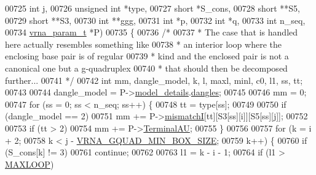 \begin{DoxyCode}
00725                                       \textcolor{keywordtype}{int}           j,
00726                                       \textcolor{keywordtype}{unsigned} \textcolor{keywordtype}{int}  *type,
00727                                       \textcolor{keywordtype}{short}         *S\_cons,
00728                                       \textcolor{keywordtype}{short}         **S5,
00729                                       \textcolor{keywordtype}{short}         **S3,
00730                                       \textcolor{keywordtype}{int}           **ggg,
00731                                       \textcolor{keywordtype}{int}           *p,
00732                                       \textcolor{keywordtype}{int}           *q,
00733                                       \textcolor{keywordtype}{int}           n\_seq,
00734                                       \mbox{\hyperlink{group__energy__parameters_structvrna__param__s}{vrna\_param\_t}}  *P)
00735 \{
00736   \textcolor{comment}{/*}
00737 \textcolor{comment}{   * The case that is handled here actually resembles something like}
00738 \textcolor{comment}{   * an interior loop where the enclosing base pair is of regular}
00739 \textcolor{comment}{   * kind and the enclosed pair is not a canonical one but a g-quadruplex}
00740 \textcolor{comment}{   * that should then be decomposed further...}
00741 \textcolor{comment}{   */}
00742   \textcolor{keywordtype}{int} mm, dangle\_model, k, l, maxl, minl, c0, l1, ss, tt;
00743 
00744   dangle\_model = P->\mbox{\hyperlink{group__energy__parameters_a7b84353eb9075c595bad4ceb871bcae7}{model\_details}}.\mbox{\hyperlink{group__model__details_adcda4ff2ea77748ae0e8700288282efc}{dangles}};
00745 
00746   mm = 0;
00747   \textcolor{keywordflow}{for} (ss = 0; ss < n\_seq; ss++) \{
00748     tt = type[ss];
00749 
00750     \textcolor{keywordflow}{if} (dangle\_model == 2)
00751       mm += P->\mbox{\hyperlink{group__energy__parameters_af1a456ce5983b107c47e5dd25727205e}{mismatchI}}[tt][S3[ss][i]][S5[ss][j]];
00752 
00753     \textcolor{keywordflow}{if} (tt > 2)
00754       mm += P->\mbox{\hyperlink{group__energy__parameters_a0ad35507a03ba7f751e82cb375e991dd}{TerminalAU}};
00755   \}
00756 
00757   \textcolor{keywordflow}{for} (k = i + 2;
00758        k < j - \mbox{\hyperlink{group__energy__parameters_gad7bdd880afca461f97763d79ee57a347}{VRNA\_GQUAD\_MIN\_BOX\_SIZE}};
00759        k++) \{
00760     \textcolor{keywordflow}{if} (S\_cons[k] != 3)
00761       \textcolor{keywordflow}{continue};
00762 
00763     l1 = k - i - 1;
00764     \textcolor{keywordflow}{if} (l1 > \mbox{\hyperlink{energy__const_8h_ad1bd6eabac419670ddd3c9ed82145988}{MAXLOOP}})

\end{DoxyCode}
